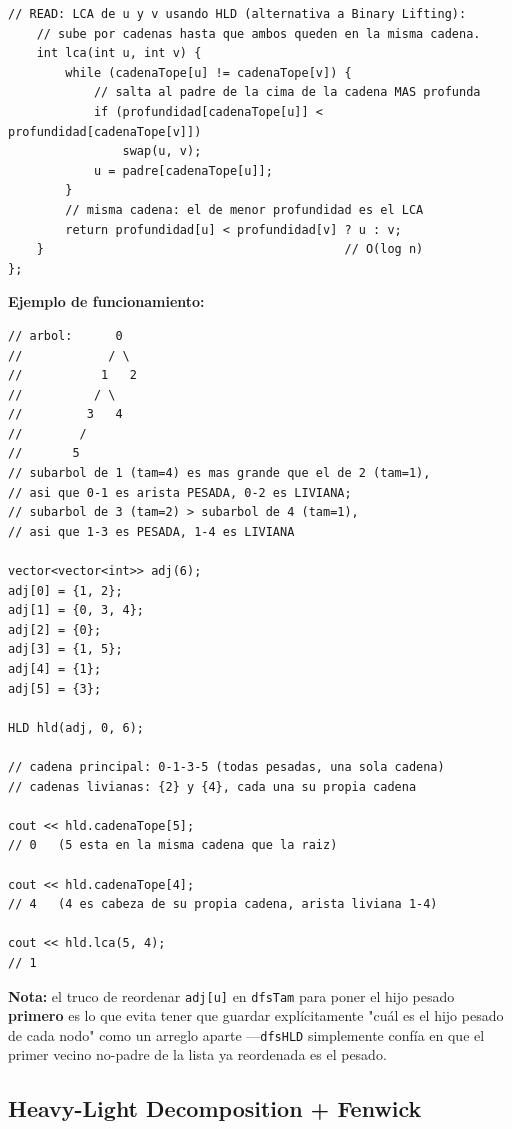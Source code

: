 \documentclass[10pt,a4paper,twocolumn]{article}
\begin{document}
\begin{lstlisting}[style=cpp]
    // READ: LCA de u y v usando HLD (alternativa a Binary Lifting):
    // sube por cadenas hasta que ambos queden en la misma cadena.
    int lca(int u, int v) {
        while (cadenaTope[u] != cadenaTope[v]) {
            // salta al padre de la cima de la cadena MAS profunda
            if (profundidad[cadenaTope[u]] < profundidad[cadenaTope[v]])
                swap(u, v);
            u = padre[cadenaTope[u]];
        }
        // misma cadena: el de menor profundidad es el LCA
        return profundidad[u] < profundidad[v] ? u : v;
    }                                          // O(log n)
};
\end{lstlisting}

\textbf{Ejemplo de funcionamiento:}

\begin{lstlisting}[style=cpp]
// arbol:      0
//            / \
//           1   2
//          / \
//         3   4
//        /
//       5
// subarbol de 1 (tam=4) es mas grande que el de 2 (tam=1),
// asi que 0-1 es arista PESADA, 0-2 es LIVIANA;
// subarbol de 3 (tam=2) > subarbol de 4 (tam=1),
// asi que 1-3 es PESADA, 1-4 es LIVIANA

vector<vector<int>> adj(6);
adj[0] = {1, 2};
adj[1] = {0, 3, 4};
adj[2] = {0};
adj[3] = {1, 5};
adj[4] = {1};
adj[5] = {3};

HLD hld(adj, 0, 6);

// cadena principal: 0-1-3-5 (todas pesadas, una sola cadena)
// cadenas livianas: {2} y {4}, cada una su propia cadena

cout << hld.cadenaTope[5];
// 0   (5 esta en la misma cadena que la raiz)

cout << hld.cadenaTope[4];
// 4   (4 es cabeza de su propia cadena, arista liviana 1-4)

cout << hld.lca(5, 4);
// 1
\end{lstlisting}

\textbf{Nota:} el truco de reordenar \texttt{adj[u]} en \texttt{dfsTam}
para poner el hijo pesado \textbf{primero} es lo que evita tener que
guardar explícitamente "cuál es el hijo pesado de cada nodo" como un
arreglo aparte —\texttt{dfsHLD} simplemente confía en que el primer
vecino no-padre de la lista ya reordenada es el pesado.


\subsection{Heavy-Light Decomposition + Fenwick}
\end{document}
